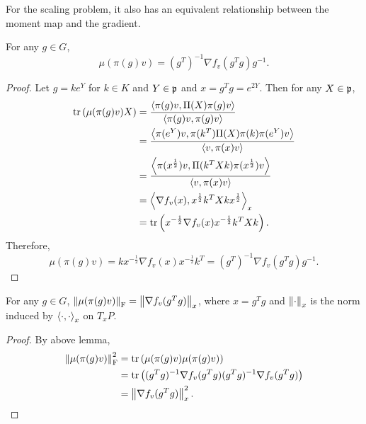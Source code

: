 \documentclass[suri,pdfbookmark]{engsuribt} %
\begin{document}
  For the scaling problem, it also has an equivalent relationship between the moment map and the gradient.
  \begin{lem}
    For any $g \in G$,
    \begin{equation*}
      \mu(\pi(g)v)  = (g^T)^{-1} \nabla f_v(g^Tg) g^{-1}.
    \end{equation*}
  \end{lem}
  \begin{proof}
    Let $g = ke^Y$ for $k \in K$ and $Y \in \mathfrak{p}$ and $x = g^Tg = e^{2Y}$. Then for any $X \in \mathfrak{p}$,
    \begin{equation*}
      \begin{split}
        \operatorname{tr}\left(\mu(\pi(g)v)X\right) &=  \frac{\left\langle \pi(g)v,\Pi(X)\pi(g)v \right\rangle}{\left\langle \pi(g)v,\pi(g)v \right\rangle} \\
         &=  \frac{\left\langle \pi(e^{Y})v,\pi(k^T)\Pi(X)\pi(k)\pi(e^{Y})v \right\rangle}{\left\langle v,\pi(x)v \right\rangle} \\
         &= \frac{\left\langle \pi(x^{\frac{1}{2}})v,\Pi(k^TXk)\pi(x^{\frac{1}{2}})v \right\rangle}{\left\langle v,\pi(x)v \right\rangle} \\
         &= \left\langle \nabla f_v(x),x^{\frac{1}{2}}k^TXkx^{\frac{1}{2}} \right\rangle_x \\
         &= \operatorname{tr}\left(x^{-\frac{1}{2}}\nabla f_v(x)x^{-\frac{1}{2}}k^TXk\right).
      \end{split}
    \end{equation*}
    Therefore,
    \begin{equation*}
      \mu(\pi(g)v) = kx^{-\frac{1}{2}}\nabla f_v(x)x^{-\frac{1}{2}}k^T = (g^T)^{-1} \nabla f_v(g^Tg) g^{-1}.
    \end{equation*}
  \end{proof}
  \begin{cor}
    For any $g \in G$, $\left\lVert\mu(\pi(g)v)\right\lVert_{\operatorname{F}} = \left\lVert\nabla f_v(g^Tg)\right\lVert_{x}$, where $x = g^Tg$ and $\left\lVert\cdot\right\lVert_x$ is the norm induced by $\left\langle \cdot,\cdot \right\rangle_x$ on $T_xP$.
  \end{cor}
  \begin{proof}
    By above lemma,
    \begin{equation*}
      \begin{split}
        \left\lVert\mu(\pi(g)v)\right\lVert_{\operatorname{F}}^2 &=\operatorname{tr}\left(\mu(\pi(g)v)\mu(\pi(g)v)\right) \\
        &= \operatorname{tr}\left((g^Tg)^{-1} \nabla f_v(g^Tg) (g^Tg)^{-1} \nabla f_v(g^Tg)\right) \\
        &=  \left\lVert\nabla f_v(g^Tg)\right\lVert_{x}^2.
      \end{split}
    \end{equation*}
  \end{proof}
\end{document}
